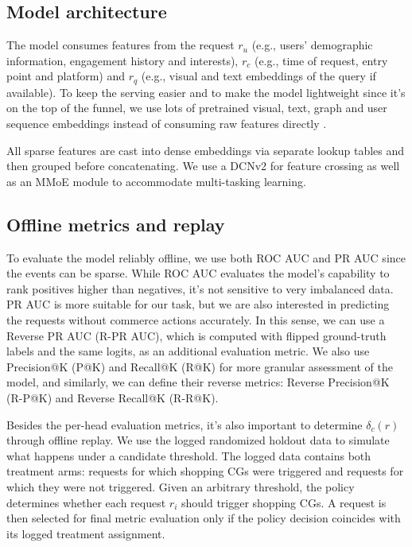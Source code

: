 \documentclass[sigconf, authorversion]{acmart}
\begin{document}
\subsection{Model architecture}
The model consumes features from the request $r_u$ (e.g., users' demographic information, engagement history and interests), $r_c$ (e.g., time of request, entry point and platform) and $r_q$ (e.g., visual and text embeddings of the query if available). To keep the serving easier and to make the model lightweight since it's on the top of the funnel, we use lots of pretrained visual, text, graph and user sequence embeddings instead of consuming raw features directly \cite{PinsItemSage, PinsLinkSage, PinsPinSage}.

All sparse features are cast into dense embeddings via separate lookup tables and then grouped before concatenating. We use a DCNv2 for feature crossing as well as an MMoE module to accommodate multi-tasking learning.

\subsection{Offline metrics and replay}
To evaluate the model reliably offline, we use both ROC AUC and PR AUC since the events can be sparse. While ROC AUC evaluates the model's capability to rank positives higher than negatives, it's not sensitive to very imbalanced data. PR AUC is more suitable for our task, but we are also interested in predicting the requests without commerce actions accurately. In this sense, we can use a Reverse PR AUC (R-PR AUC), which is computed with flipped ground-truth labels and the same logits, as an additional evaluation metric. We also use Precision@K (P@K) and Recall@K (R@K) for more granular assessment of the model, and similarly, we can define their reverse metrics: Reverse Precision@K (R-P@K) and Reverse Recall@K (R-R@K).

Besides the per-head evaluation metrics, it's also important to determine $\delta_c(r)$ through offline replay. We use the logged randomized holdout data to simulate what happens under a candidate threshold. The logged data contains both treatment arms: requests for which shopping CGs were triggered and requests for which they were not triggered. Given an arbitrary threshold, the policy determines whether each request $r_i$ should trigger shopping CGs. A request is then selected for final metric evaluation only if the policy decision coincides with its logged treatment assignment.
\end{document}
